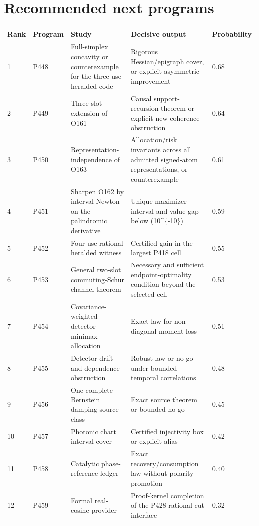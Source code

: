 \documentclass[11pt,a4paper,openany]{report}
\begin{document}
\chapter{Recommended next programs}

\begin{center}
\begingroup\fontsize{7}{8.4}\selectfont
\setlength{\tabcolsep}{2.5pt}
\renewcommand{\arraystretch}{1.16}
\begin{longtable}{@{}p{}p{}p{}p{}p{}@{}}
\toprule
\textbf{Rank} & \textbf{Program} & \textbf{Study} & \textbf{Decisive output} & \textbf{Probability} \\
\midrule
\endhead
1 & P448 & Full-simplex concavity or counterexample for the three-use heralded code & Rigorous Hessian/\allowbreak{}epigraph cover, or explicit asymmetric improvement & 0.68 \\
2 & P449 & Three-slot extension of O161 & Causal support-recursion theorem or explicit new coherence obstruction & 0.64 \\
3 & P450 & Representation-independence of O163 & Allocation/\allowbreak{}risk invariants across all admitted signed-atom representations, or counterexample & 0.61 \\
4 & P451 & Sharpen O162 by interval Newton on the palindromic derivative & Unique maximizer interval and value gap below (10\textasciicircum{}\{-10\}) & 0.59 \\
5 & P452 & Four-use rational heralded witness & Certified gain in the largest P418 cell & 0.55 \\
6 & P453 & General two-slot commuting-Schur channel theorem & Necessary and sufficient endpoint-optimality condition beyond the selected cell & 0.53 \\
7 & P454 & Covariance-weighted detector minimax allocation & Exact law for non-diagonal moment loss & 0.51 \\
8 & P455 & Detector drift and dependence obstruction & Robust law or no-go under bounded temporal correlations & 0.48 \\
9 & P456 & One complete-Bernstein damping-source class & Exact source theorem or bounded no-go & 0.45 \\
10 & P457 & Photonic chart interval cover & Certified injectivity box or explicit alias & 0.42 \\
11 & P458 & Catalytic phase-reference ledger & Exact recovery/\allowbreak{}consumption law without polarity promotion & 0.40 \\
12 & P459 & Formal real-cosine provider & Proof-kernel completion of the P428 rational-cut interface & 0.32 \\
\bottomrule
\end{longtable}
\endgroup
\end{center}
\end{document}
